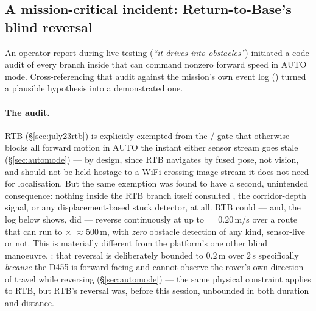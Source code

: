 \subsection{A mission-critical incident: Return-to-Base's blind reversal}
\label{sec:july24rtb}
An operator report during live testing (\emph{``it drives into
obstacles''}) initiated a code audit of every branch inside 
that can command nonzero forward speed in AUTO mode. Cross-referencing that
audit against the mission's own event log ()
turned a plausible hypothesis into a demonstrated one.

\paragraph{The audit.} RTB (\S\ref{sec:july23rtb}) is explicitly exempted
from the / gate that otherwise blocks
all forward motion in AUTO the instant either sensor stream goes stale
(\S\ref{sec:automode}) — by design, since RTB navigates by fused pose, not
vision, and should not be held hostage to a WiFi-crossing image stream it
does not need for localisation. But the same exemption was found to have a
second, unintended consequence: nothing inside the RTB branch itself
consulted , the corridor-depth signal, or any
displacement-based stuck detector, at all. RTB could — and, the log below
shows, did — reverse continuously at up to 
$=0.20$\,m/s over a route that can run to $\times$
$\approx500$\,m, with \emph{zero} obstacle
detection of any kind, sensor-live or not. This is materially different
from the platform's one other blind manoeuvre,
: that reversal is deliberately bounded to
$0.2$\,m over $2$\,s specifically \emph{because} the D455 is forward-facing
and cannot observe the rover's own direction of travel while reversing
(\S\ref{sec:automode}) — the same physical constraint applies to RTB, but
RTB's reversal was, before this session, unbounded in both duration and
distance.

